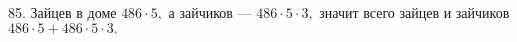 85. Зайцев в доме $486\cdot5,$ а зайчиков --- $486\cdot5\cdot3,$ значит всего зайцев и зайчиков $486\cdot5+486\cdot5\cdot3.$\\
